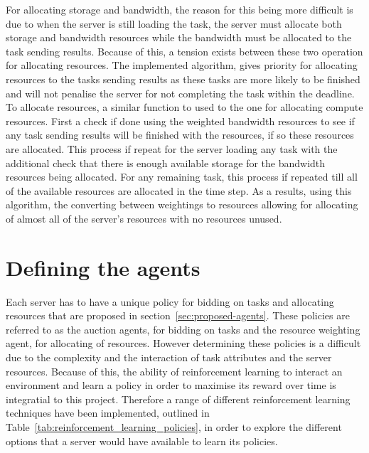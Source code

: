 For allocating storage and bandwidth, the reason for this being more difficult is due to when the server is still
loading the task, the server must allocate both storage and bandwidth resources while the bandwidth must be allocated
to the task sending results. Because of this, a tension exists between these two operation for allocating resources.
The implemented algorithm, gives priority for allocating resources to the tasks sending results as these tasks are more
likely to be finished and will not penalise the server for not completing the task within the deadline. To allocate
resources, a similar function to used to the one for allocating compute resources. First a check if done using the
weighted bandwidth resources to see if any task sending results will be finished with the resources, if so these
resources are allocated. This process if repeat for the server loading any task with the additional check that there
is enough available storage for the bandwidth resources being allocated. For any remaining task, this process if
repeated till all of the available resources are allocated in the time step. As a results, using this algorithm, the
converting between weightings to resources allowing for allocating of almost all of the server's resources with no
resources unused.

\section{Defining the agents}\label{sec:agent-definition}
Each server has to have a unique policy for bidding on tasks and allocating resources that are proposed in
section~\ref{sec:proposed-agents}. These policies are referred to as the auction agents, for bidding on tasks and the
resource weighting agent, for allocating of resources. However determining these policies is a difficult due to the
complexity and the interaction of task attributes and the server resources. Because of this, the ability of
reinforcement learning to interact an environment and learn a policy in order to maximise its reward over time is
integratial to this project. Therefore a range of different reinforcement learning techniques have been implemented,
outlined in Table~\ref{tab:reinforcement_learning_policies}, in order to explore the different options that a server
would have available to learn its policies.


